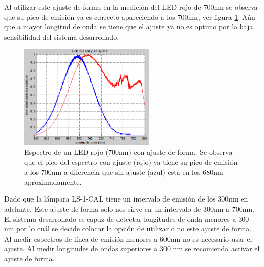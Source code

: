 Al utilizar este ajuste de forma en la medición del LED rojo de 700nm se observa que su pico de emisión ya es correcto apareciendo a los 700nm, ver figura \ref{fig:ledrojoa}. Aún que a mayor longitud de onda se tiene que el ajuste ya no es optimo por la baja sensibilidad del sistema desarrollado. 
\begin{figure}[h]
	\centering
	\includegraphics[width=0.8\linewidth,height=5cm]{Imagenes/4/LEDrojoA}
	\caption[Espectro de un LED rojo (700nm) con ajuste de forma.]{Espectro de un LED rojo (700nm) con ajuste de forma. Se observa que el pico del espectro con ajuste (rojo) ya tiene su pico de emisión a los 700nm a diferencia que sin ajuste (azul) esta en los 680nm aproximadamente.}
	\label{fig:ledrojoa}
\end{figure}

Dado que la lámpara LS-1-CAL tiene un intervalo de emisión de los 300nm en adelante. Este ajuste de forma solo nos sirve en un intervalo de 300nm a 700nm. El sistema desarrollado es capaz de detectar longitudes de onda menores a 300 nm por lo cuál se decide colocar la opción de utilizar o no este ajuste de forma. Al medir espectros de línea de emisión menores a 600nm no es necesario usar el ajuste. Al medir longitudes de ondas superiores a 300 nm se recomienda activar el ajuste de forma.



 
